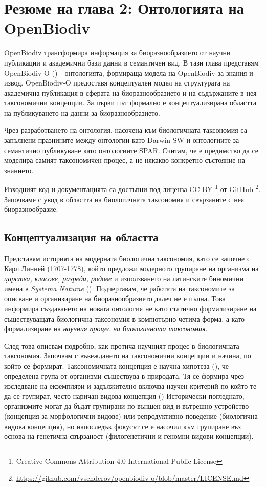 \chapter{Резюме на глава 2: Онтологията на OpenBiodiv}
\label{chapter-ontology}

OpenBiodiv трансформира информация за биоразнообразието от научни публикации и академични бази данни в семантичен вид. В тази глава представям OpenBiodiv-O (\cite{senderov_openbiodiv-o:_2018}) - онтологията, формираща модела на OpenBiodiv за знания и извод. OpenBiodiv-O предоставя концептуален модел на структурата на академична публикация в сферата на биоразнообразието и на съдържаните в нея таксономични концепции. За първи път формално е концептуализирана областта на публикуването на данни за биоразнообразието.

Чрез разработването на онтология, насочена към биологичната таксономия са запълнени празнините между онтологии като Darwin-SW и онтологиите за семантично публикуване като онтологиите SPAR. Считам, че е предимство да се моделира самият таксономичен процес, а не някакво конкретно състояние на знанието.

Изходният код и документацията са достъпни под лиценза CC BY \footnote {Creative Commons Attribution 4.0 International Public License} от GitHub \footnote {\url{https://github.com/vsenderov/openbiodiv-o/blob/master/LICENSE.md}}. Започваме с увод в областта на биологичната таксономия и свързаните с нея биоразнообразие.

\section{Концептуализация на областта}

Представям историята на модерната биологична таксономия, като се започне с Карл Линней (1707-1778), който предложи модерното групиране на организма на \emph{царства, класове, разреди, родове} и използването на латинските биномични имена в \emph{Systema Naturae} (\cite {linnaeus_systema_1758}). Подчертавам, че работата на таксономите за описване и организиране на биоразнообразието далеч не е пълна. Това информира създаването на новата онтология не като статично формализиране на съществуващата биологична таксономия в компютърно четима форма, а като формализиране на \emph{научния процес на биологичната таксономия}.

След това описвам подробно, как протича научният процес в биологичната таксономия. Започвам с въвеждането на таксономични концепции и начина, по който се формират. Таксономичната концепция е научна хипотеза (\cite{deans_time_2012}), че определена група от организми съществува в природата. Тя се формира чрез изследване на екземпляри и задължително включва научен критерий по който те да се групират, често наричан видова концепция (\cite {mallet_species_2001}) Исторически погледнато, организмите могат да бъдат групирани по външен вид и вътрешно устройство (концепция за морфологични видове) или репродуктивно поведение (биологична видова концепция), но напоследък фокусът се е насочил към групиране въз основа на генетична свързаност (филогенетични и геномни видови концепции).

